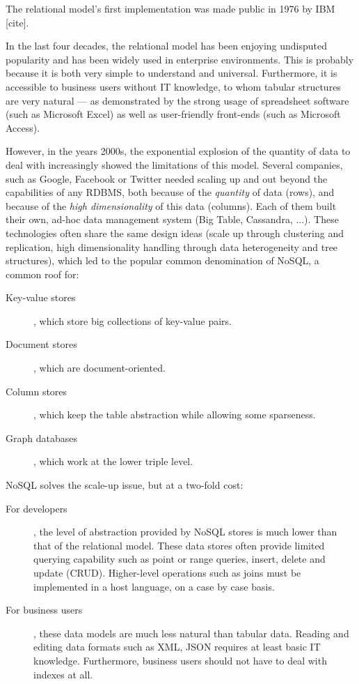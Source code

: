 \documentclass{vldb}
\begin{document}
The relational model's first implementation was made public in 1976 by IBM [cite].

In the last four decades, the relational model has been enjoying undisputed popularity and has been widely used in enterprise environments. This is probably because it is both very simple to understand and universal. Furthermore, it is accessible to business users without IT knowledge, to whom tabular structures are very natural --- as demonstrated by the strong usage of spreadsheet software (such as Microsoft Excel) as well as user-friendly front-ends (such as Microsoft Access).

However, in the years 2000s, the exponential explosion of the quantity of data to deal with increasingly showed the limitations of this model. Several companies, such as Google, Facebook or Twitter needed scaling up and out beyond the capabilities of any RDBMS, both because of the \emph{quantity} of data (rows), and because of the \emph{high dimensionality} of this data (columns). Each of them built their own, ad-hoc data management system (Big Table, Cassandra, ...). These technologies often share the same design ideas (scale up through clustering and replication, high dimensionality handling through data heterogeneity and tree structures), which led to the popular common denomination of NoSQL, a common roof for:
\begin{description}
\item[Key-value stores], which store big collections of key-value pairs.
\item[Document stores], which are document-oriented.
\item[Column stores], which keep the table abstraction while allowing some sparseness.
\item[Graph databases], which work at the lower triple level.
\end{description}

NoSQL solves the scale-up issue, but at a two-fold cost:
\begin{description}
\item[For developers], the level of abstraction provided by NoSQL stores is much lower than that of the relational model. These data stores often provide limited querying capability such as point or range queries, insert, delete and update (CRUD). Higher-level operations such as joins must be implemented in a host language, on a case by case basis.
\item[For business users], these data models are much less natural than tabular data. Reading and editing data formats such as XML, JSON requires at least basic IT knowledge. Furthermore, business users should not have to deal with indexes at all.
\end{description}
\end{document}
